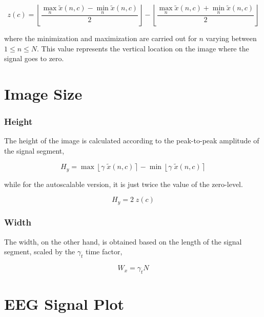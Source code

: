\begin{equation}
z(c) = \left \lfloor{ \frac{\max_{n} \tilde{x}(n,c)  - \min_{n} \tilde{x}(n,c) }{2} }\right \rfloor -   \left \lfloor{ \frac{\max_{n} \tilde{x}(n,c)  + \min_{n} \tilde{x}(n,c)}{ 2} }\right \rfloor
\label{eq:zerolevel}
\end{equation}

\noindent where the minimization and maximization are carried out for $n$ varying between ${1 \leq n\leq N}$. This value represents the vertical location on the image where the signal goes to zero.  

\section{Image Size}

\subsubsection{Height}

The height of the image is calculated according to the peak-to-peak amplitude of the signal segment,

\begin{equation}
H_y = \max \left\lfloor \gamma \; \tilde{x}(n,c) \right\rceil  - \min \left\lfloor \gamma \; \tilde{x}(n,c) \right\rceil 
\label{eq:height}
\end{equation}

\noindent while for the autoscalable version, it is just twice the value of the zero-level.

\begin{equation}
H_y = 2 \; z(c)
\label{eq:autoscaleheight}
\end{equation}


\subsubsection{Width}

The width, on the other hand, is obtained based on the length of the signal segment, scaled by the $\gamma_t$  time factor,

\begin{equation}
W_x = \gamma_t  N
\label{eq:width}
\end{equation}

\section{EEG Signal Plot}
\label{Plot}

